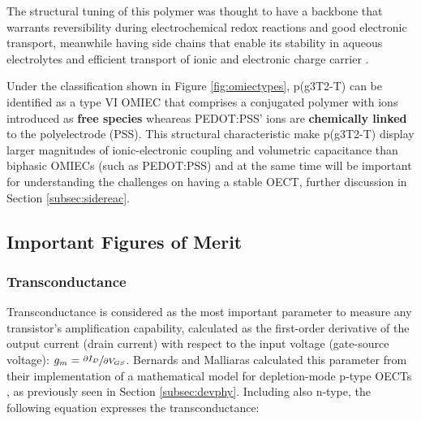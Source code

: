 The structural tuning of this polymer was thought to have a backbone that warrants reversibility during electrochemical redox reactions and good electronic transport, meanwhile having side chains that enable its stability in aqueous electrolytes and efficient transport of ionic and electronic charge carrier \cite{moiaDesignEvaluationConjugated2019}. 



Under the classification shown in Figure \ref{fig:omiectypes}, p(g3T2-T) can be identified as a type VI OMIEC that comprises a conjugated polymer with ions introduced as \textbf{free species} wheareas PEDOT:PSS' ions are \textbf{chemically linked} to the polyelectrode (PSS). This structural characteristic make p(g3T2-T) display larger magnitudes of ionic-electronic coupling and volumetric capacitance than biphasic OMIECs (such as PEDOT:PSS) \cite{paulsenOrganicMixedIonic2020} and at the same time will be important for understanding the challenges on having a stable OECT, further discussion in Section \ref{subsec:sidereac}.

\subsection{Important Figures of Merit}

\subsubsection{Transconductance}
Transconductance is considered as the most important parameter to measure any transistor's amplification capability, calculated as the first-order derivative of the output current (drain current) with respect to the input voltage (gate-source voltage): $g_{m} = \sfrac{\partial I_{D}}{\partial V_{GS}}$. Bernards and Malliaras calculated this parameter from their implementation of a mathematical model for depletion-mode p-type OECTs \cite{bernardsSteadyStateTransientBehavior2007}, as previously seen in Section \ref{subsec:devphy}. Including also n-type, the following equation expresses the transconductance: %

